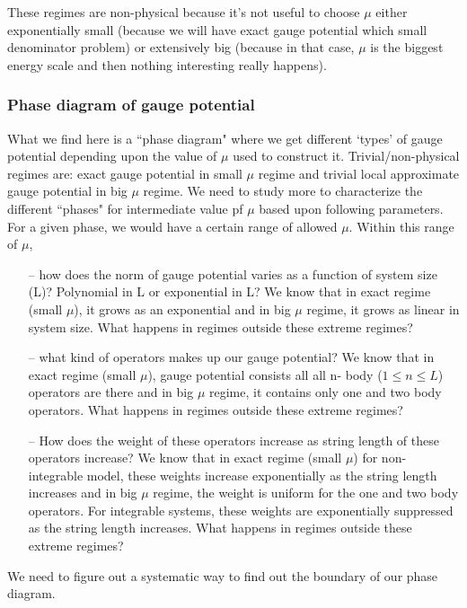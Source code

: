 \documentclass[11pt,a4paper]{article}
\begin{document}
These regimes are non-physical because it's not useful to choose $\mu$ either exponentially small (because we will have exact gauge potential which small denominator problem) or extensively big (because in that case, $\mu$ is the biggest energy scale and then nothing interesting really happens). 

\subsubsection*{Phase diagram of gauge potential }

What we find here is a ``phase diagram" where we get different `types' of gauge potential depending upon the value of $\mu$ used to construct it. Trivial/non-physical regimes are: exact gauge potential in small $\mu$ regime and trivial local approximate gauge potential in big $\mu$ regime.   We need to study more to characterize the different ``phases" for intermediate value pf $\mu$ based upon following parameters. For a given phase, we would have a certain range of allowed $\mu$. Within this range of $\mu$,
\begin{itemize}
\item[--] how does the norm of gauge potential varies as a function of system size (L)? Polynomial in L or exponential in L? We know that in exact regime (small $\mu$), it grows as an exponential and in big $\mu$ regime, it grows as linear in system size. What happens in regimes outside these extreme regimes?
\item[--] what kind of operators makes up our gauge potential? We know that in exact regime (small $\mu$), gauge potential consists all all n- body ($1 \leq n \leq L$) operators are there and in big $\mu$ regime, it contains only one and two body operators. What happens in regimes outside these extreme regimes?
\item[--] How does the weight of these operators increase as string length of these operators increase? We know that in exact regime (small $\mu$) for non-integrable model, these weights increase exponentially as the string length increases  and in big $\mu$ regime, the weight is uniform for the one and two body operators. For integrable systems, these weights are exponentially suppressed as the string length increases.  What happens in regimes outside these extreme regimes?
\end{itemize}


We need to figure out a systematic way to find out the boundary of our phase diagram.
\end{document}
